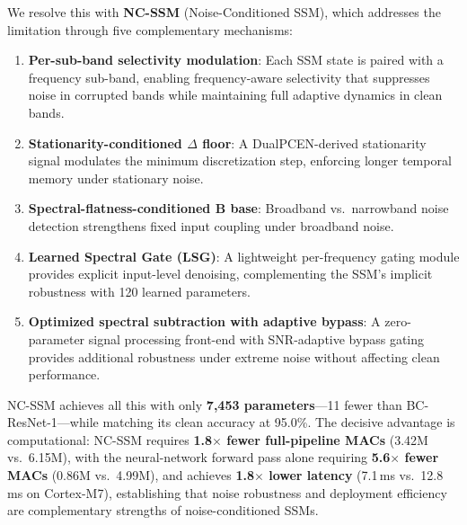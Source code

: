 \documentclass[journal]{IEEEtran}
\begin{document}
We resolve this with \textbf{NC-SSM} (Noise-Conditioned SSM), which addresses the limitation through five complementary mechanisms:
\begin{enumerate}
\setlength\itemsep{0pt}
\item \textbf{Per-sub-band selectivity modulation}: Each SSM state is paired with a frequency sub-band, enabling frequency-aware selectivity that suppresses noise in corrupted bands while maintaining full adaptive dynamics in clean bands.
\item \textbf{Stationarity-conditioned $\Delta$ floor}: A DualPCEN-derived stationarity signal modulates the minimum discretization step, enforcing longer temporal memory under stationary noise.
\item \textbf{Spectral-flatness-conditioned $\mathbf{B}$ base}: Broadband vs.\ narrowband noise detection strengthens fixed input coupling under broadband noise.
\item \textbf{Learned Spectral Gate (LSG)}: A lightweight per-frequency gating module provides explicit input-level denoising, complementing the SSM's implicit robustness with 120 learned parameters.
\item \textbf{Optimized spectral subtraction with adaptive bypass}: A zero-parameter signal processing front-end with SNR-adaptive bypass gating provides additional robustness under extreme noise without affecting clean performance.
\end{enumerate}

NC-SSM achieves all this with only \textbf{7{,}453 parameters}---11 fewer than BC-ResNet-1---while matching its clean accuracy at 95.0\%.
The decisive advantage is computational: NC-SSM requires \textbf{1.8$\times$ fewer full-pipeline MACs} (3.42M vs.\ 6.15M), with the neural-network forward pass alone requiring \textbf{5.6$\times$ fewer MACs} (0.86M vs.\ 4.99M), and achieves \textbf{1.8$\times$ lower latency} (7.1\,ms vs.\ 12.8\,ms on Cortex-M7), establishing that noise robustness and deployment efficiency are complementary strengths of noise-conditioned SSMs.
\end{document}
